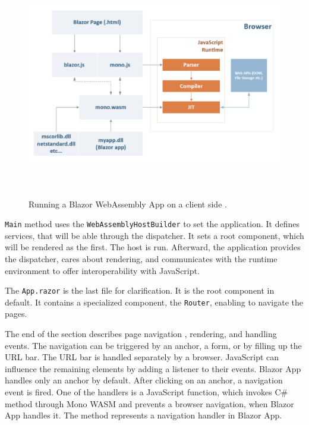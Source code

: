 \par
\begin{figure}[b!]
\centering
\includegraphics[width=140mm, height=100mm]{./img/BlazorExecution}
\caption{Running a Blazor WebAssembly App on a client side \cite{online:composition}.}
\label{img08:wasm}
\end{figure}
\par
\texttt{Main} method uses the \texttt{WebAssemblyHostBuilder} to set the application.
It defines services, that will be able through the dispatcher.
It sets a root component, which will be rendered as the first.
The host is run.
Afterward, the application provides the dispatcher, cares about rendering, and communicates with the runtime environment to offer interoperability with JavaScript.
\par
The \texttt{App.razor} is the last file for clarification.
It is the root component in default.
It contains a specialized component, the \texttt{Router}, enabling to navigate the pages.
\par
The end of the section describes page navigation \cite{online:routing}, rendering, and handling events.
The navigation can be triggered by an anchor, a form, or by filling up the URL bar.
The URL bar is handled separately by a browser.
JavaScript can influence the remaining elements by adding a listener to their events.
Blazor App handles only an anchor by default.
After clicking on an anchor, a navigation event is fired.
One of the handlers is a JavaScript function, which invokes C\# method through Mono WASM and prevents a browser navigation, when Blazor App handles it. 
The method represents a navigation handler in Blazor App.
